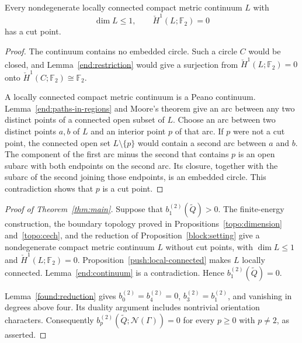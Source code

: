 \begin{lemma}\label{end:continuum}
Every nondegenerate locally connected compact metric continuum $L$
with
\[
 \dim L\le1,\qquad \check H^1(L;\mathbb F_2)=0
\]
has a cut point.
\end{lemma}

\begin{proof}
The continuum contains no embedded circle.  Such a circle $C$ would be
closed, and Lemma~\ref{end:restriction} would give a surjection from
$\check H^1(L;\mathbb F_2)=0$ onto
$\check H^1(C;\mathbb F_2)\cong\mathbb F_2$.

A locally connected compact metric continuum is a Peano continuum.
Lemma~\ref{end:paths-in-regions} and Moore's theorem give an arc
between any two distinct points of a connected open subset of $L$.
Choose an arc between two distinct points $a,b$ of
$L$ and an interior point $p$ of that arc.  If $p$ were not a cut point,
the connected open set $L\setminus\{p\}$ would contain a second arc
between $a$ and $b$.  The component of the first arc minus the second
that contains $p$ is an open subarc with both endpoints on the second
arc.  Its closure, together with the subarc of the second joining those
endpoints, is an embedded circle.  This contradiction shows that $p$
is a cut point.
\end{proof}

\begin{proof}[Proof of Theorem~\ref{thm:main}]
Suppose that $b_1^{(2)}(\widetilde Q)>0$.  The finite-energy construction,
the boundary topology proved in Propositions~\ref{topo:dimension}
and~\ref{topo:cech}, and the reduction of Proposition~\ref{block:setting}
give a nondegenerate compact metric continuum $L$ without cut points,
with $\dim L\le1$ and $\check H^1(L;\mathbb F_2)=0$.
Proposition~\ref{push:local-connected} makes $L$ locally connected.
Lemma~\ref{end:continuum} is a contradiction.  Hence
$b_1^{(2)}(\widetilde Q)=0$.

Lemma~\ref{found:reduction} gives $b_0^{(2)}=b_4^{(2)}=0$,
$b_3^{(2)}=b_1^{(2)}$, and vanishing in degrees above four.  Its
duality argument includes nontrivial orientation characters.
Consequently $b_p^{(2)}(\widetilde Q;\mathcal N(\Gamma))=0$ for every
$p\ge0$ with $p\ne2$, as asserted.
\end{proof}
